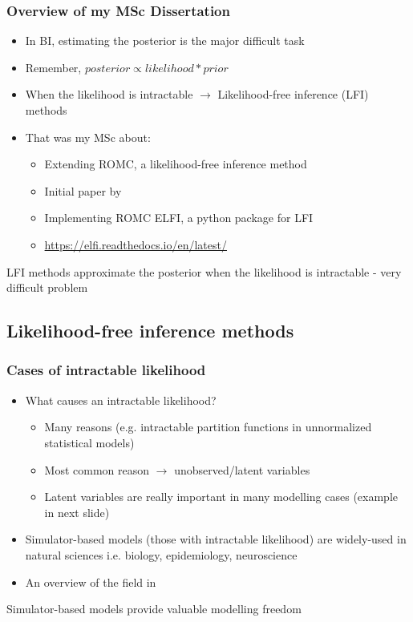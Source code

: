 \begin{frame}
  \frametitle{Overview of my MSc Dissertation}
  \begin{itemize}
  \item In BI, estimating the posterior is the major difficult task
  \item Remember, \( posterior \propto likelihood * prior \)
  \item When the likelihood is intractable \( \rightarrow\) Likelihood-free inference (LFI) methods
  \item That was my MSc about:
    \begin{itemize}
    \item Extending ROMC, a likelihood-free inference method
    \item Initial paper by~\cite{Ikonomov2020RobustOM}
    \item Implementing ROMC ELFI, a python package for LFI
    \item \href{https://elfi.readthedocs.io/en/latest/}{https://elfi.readthedocs.io/en/latest/}    \end{itemize}
  \end{itemize}

  \noindent\makebox[\linewidth]{\rule{\paperwidth}{0.4pt}}
  LFI methods approximate the posterior when the likelihood is intractable - \alert{very difficult problem}
\end{frame}

\subsection{Likelihood-free inference methods}

\begin{frame}
  \frametitle{Cases of intractable likelihood}
  \begin{itemize}
    \item What causes an intractable likelihood?
    \begin{itemize}
    \item Many reasons (e.g. intractable partition functions in unnormalized statistical models)
    \item Most common reason \( \rightarrow \) \alert{unobserved/latent variables}
    \item Latent variables are really important in many modelling cases (example in next slide)
    \end{itemize}
  \item Simulator-based models (those with intractable likelihood) are widely-used in natural sciences i.e. biology, epidemiology, neuroscience
    \item An overview of the field in \cite{Cranmer30055}

    \end{itemize}
\noindent\makebox[\linewidth]{\rule{\paperwidth}{0.4pt}}
Simulator-based models provide valuable \alert{modelling freedom}
\end{frame}

